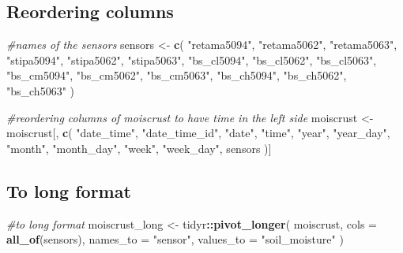 \documentclass[]{article}
\newenvironment{Shaded}{\begin{snugshade}}{\end{snugshade}}
\newcommand{\CommentTok}[1]{\textcolor[rgb]{0.56,0.35,0.01}{\textit{#1}}}
\newcommand{\DataTypeTok}[1]{\textcolor[rgb]{0.13,0.29,0.53}{#1}}
\newcommand{\KeywordTok}[1]{\textcolor[rgb]{0.13,0.29,0.53}{\textbf{#1}}}
\newcommand{\NormalTok}[1]{#1}
\newcommand{\OperatorTok}[1]{\textcolor[rgb]{0.81,0.36,0.00}{\textbf{#1}}}
\newcommand{\StringTok}[1]{\textcolor[rgb]{0.31,0.60,0.02}{#1}}
\begin{document}
\hypertarget{reordering-columns}{%
\subsection{Reordering columns}\label{reordering-columns}}

\begin{Shaded}
\begin{Highlighting}[]
\CommentTok{#names of the sensors}
\NormalTok{sensors <-}\StringTok{ }\KeywordTok{c}\NormalTok{(}
  \StringTok{"retama5094"}\NormalTok{,}
  \StringTok{"retama5062"}\NormalTok{,}
  \StringTok{"retama5063"}\NormalTok{,}
  \StringTok{"stipa5094"}\NormalTok{,}
  \StringTok{"stipa5062"}\NormalTok{,}
  \StringTok{"stipa5063"}\NormalTok{,}
  \StringTok{"bs_cl5094"}\NormalTok{,}
  \StringTok{"bs_cl5062"}\NormalTok{,}
  \StringTok{"bs_cl5063"}\NormalTok{,}
  \StringTok{"bs_cm5094"}\NormalTok{,}
  \StringTok{"bs_cm5062"}\NormalTok{,}
  \StringTok{"bs_cm5063"}\NormalTok{,}
  \StringTok{"bs_ch5094"}\NormalTok{,}
  \StringTok{"bs_ch5062"}\NormalTok{,}
  \StringTok{"bs_ch5063"}
\NormalTok{)}

\CommentTok{#reordering columns of moiscrust to have time in the left side}
\NormalTok{moiscrust <-}\StringTok{ }\NormalTok{moiscrust[, }\KeywordTok{c}\NormalTok{(}
  \StringTok{"date_time"}\NormalTok{,}
  \StringTok{"date_time_id"}\NormalTok{,}
  \StringTok{"date"}\NormalTok{,}
  \StringTok{"time"}\NormalTok{,}
  \StringTok{"year"}\NormalTok{,}
  \StringTok{"year_day"}\NormalTok{,}
  \StringTok{"month"}\NormalTok{,}
  \StringTok{"month_day"}\NormalTok{,}
  \StringTok{"week"}\NormalTok{,}
  \StringTok{"week_day"}\NormalTok{,}
\NormalTok{  sensors}
\NormalTok{)]}
\end{Highlighting}
\end{Shaded}

\hypertarget{to-long-format}{%
\subsection{To long format}\label{to-long-format}}

\begin{Shaded}
\begin{Highlighting}[]
\CommentTok{#to long format}
\NormalTok{moiscrust_long <-}\StringTok{ }\NormalTok{tidyr}\OperatorTok{::}\KeywordTok{pivot_longer}\NormalTok{(}
\NormalTok{  moiscrust,}
  \DataTypeTok{cols =} \KeywordTok{all_of}\NormalTok{(sensors),}
  \DataTypeTok{names_to =} \StringTok{"sensor"}\NormalTok{,}
  \DataTypeTok{values_to =} \StringTok{"soil_moisture"}
\NormalTok{)}
\end{Highlighting}
\end{Shaded}
\end{document}
